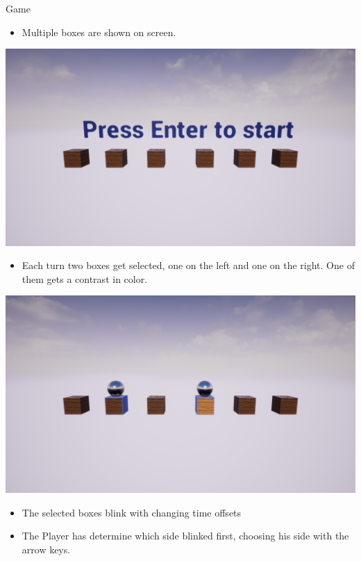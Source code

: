 \documentclass[a0paper,portrait]{baposter}
\begin{document}
\begin{poster}
		\begin{posterbox}[name=game,span=1,column=1,row=1,below=intro]{Game}
			\begin{itemize}
				\item Multiple boxes are shown on screen.
			\end{itemize}
			\includegraphics[width=1\textwidth]{Screenshots/gameStart.png}
			\begin{itemize}
				\item Each turn two boxes get selected, one on the left and one on the right. One of them gets a contrast in color.
			\end{itemize}
			\includegraphics[width=1 \textwidth]{Screenshots/bothStimuli.png}
			\begin{itemize}
				\item The selected boxes blink with changing time offsets
			\end{itemize}
			\begin{itemize}
				\item The Player has determine which side blinked first, choosing his side with the arrow keys.
			\end{itemize}
		\end{posterbox}
		

\end{poster}
\end{document}
